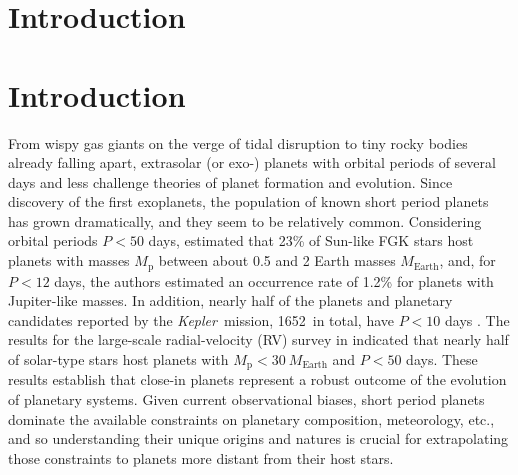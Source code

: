 \documentclass[smallcondensed]{svjour3}    %
\newcommand{\NumKeplerPlanetsPleTen}{1652}
\newcommand{\kepler}{\emph{Kepler}}
\begin{document}
\section{Introduction}
\label{sec:introduction}

\section{Introduction}
From wispy gas giants on the verge of tidal disruption to tiny rocky bodies already falling apart, extrasolar (or exo-) planets with orbital periods of several days and less challenge theories of planet formation and evolution. Since discovery of the first exoplanets, the population of known short period planets has grown dramatically, and they seem to be relatively common. Considering orbital periods $P < 50$ days, \cite{2010Sci...330..653H} estimated that 23\% of Sun-like FGK stars host planets with masses $M_\mathrm{p}$ between about 0.5 and 2 Earth masses $M_\mathrm{Earth}$, and, for $P < 12$ days, the authors estimated an occurrence rate of 1.2\% for planets with Jupiter-like masses. In addition, nearly half of the planets and planetary candidates reported by the \kepler~mission, \NumKeplerPlanetsPleTen~in total,  have $P < 10$ days \cite{2013ApJS..204...24B}. The results for the large-scale radial-velocity (RV) survey in \cite{2011arXiv1109.2497M} indicated that nearly half of solar-type stars host planets with $M_\mathrm{p} < 30\ M_\mathrm{Earth}$ and $P < 50$ days. These results establish that close-in planets represent a robust outcome of the evolution of planetary systems. Given current observational biases, short period planets dominate the available constraints on planetary composition, meteorology, etc., and so understanding their unique origins and natures is crucial for extrapolating those constraints to planets more distant from their host stars. 
\end{document}
